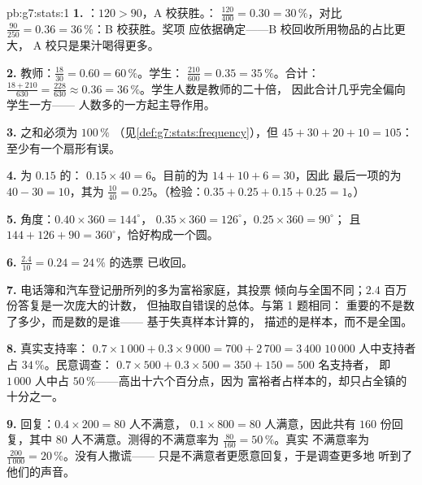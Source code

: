 \begin{solution}{pb:g7:stats:1}
\textbf{1.} ：$120 > 90$，A 校获胜。：
$\frac{120}{400} = 0.30 = 30\,\%$，对比
$\frac{90}{250} = 0.36 = 36\,\%$：B 校获胜。奖项
应依据确定——B 校回收所用物品的占比更大，
A 校只是果汁喝得更多。

\textbf{2.} 教师：$\frac{18}{30} = 0.60 = 60\,\%$。学生：
$\frac{210}{600} = 0.35 = 35\,\%$。合计：
$\frac{18 + 210}{630} = \frac{228}{630} \approx 0.36 =
36\,\%$。学生人数是教师的二十倍，
因此合计几乎完全偏向学生一方——
人数多的一方起主导作用。

\textbf{3.} 之和必须为 $100\,\%$
（见\cref{def:g7:stats:frequency}），但
$45 + 30 + 20 + 10 = 105$：至少有一个扇形有误。

\textbf{4.} 为 $0.15$ 的：
$0.15 \times 40 = 6$。目前的为 $14 + 10 + 6 = 30$，因此
最后一项的为 $40 - 30 = 10$，其为
$\frac{10}{40} = 0.25$。（检验：$0.35 + 0.25 + 0.15 + 0.25 =
1$。）

\textbf{5.} 角度：$0.40 \times 360 = 144^\circ$，
$0.35 \times 360 = 126^\circ$，$0.25 \times 360 = 90^\circ$；
且 $144 + 126 + 90 = 360^\circ$，恰好构成一个圆。

\textbf{6.} $\frac{2.4}{10} = 0.24 = 24\,\%$ 的选票
已收回。

\textbf{7.} 电话簿和汽车登记册所列的多为富裕家庭，其投票
倾向与全国不同；$2.4$ 百万份答复是一次庞大的计数，
但抽取自错误的总体。与第 1 题相同：
重要的不是数了多少，而是数的是谁——
基于失真样本计算的，
描述的是样本，而不是全国。

\textbf{8.} 真实支持率：
$0.7 \times 1\,000 + 0.3 \times 9\,000 = 700 + 2\,700 = 3\,400$
$10\,000$ 人中支持者占 $34\,\%$。民意调查：
$0.7 \times 500 + 0.3 \times 500 = 350 + 150 = 500$ 名支持者，
即 $1\,000$ 人中占 $50\,\%$——高出十六个百分点，因为
富裕者占样本的，却只占全镇的十分之一。

\textbf{9.} 回复：$0.4 \times 200 = 80$ 人不满意，
$0.1 \times 800 = 80$ 人满意，因此共有 $160$ 份回复，其中
$80$ 人不满意。测得的不满意率为 $\frac{80}{160} = 50\,\%$。真实
不满意率为 $\frac{200}{1\,000} = 20\,\%$。没有人撒谎——
只是不满意者更愿意回复，于是调查更多地
听到了他们的声音。


\end{solution}
